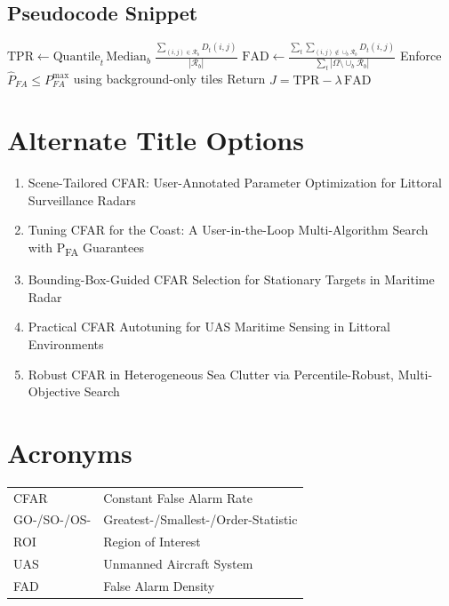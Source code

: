 \documentclass[conf]{new-aiaa}
\begin{document}
\subsection{Pseudocode Snippet}
\begin{algorithm}[h]
\caption{Score and Constraint Evaluation}
\begin{algorithmic}[1]
\STATE $\mathrm{TPR}\leftarrow \mathrm{Quantile}_t\,\mathrm{Median}_b\;\frac{\sum_{(i,j)\in\mathcal{R}_b} D_t(i,j)}{|\mathcal{R}_b|}$
\STATE $\mathrm{FAD}\leftarrow \frac{\sum_{t}\sum_{(i,j)\notin\cup_b \mathcal{R}_b} D_t(i,j)}{\sum_{t}|\Omega\setminus\cup_b \mathcal{R}_b|}$
\STATE Enforce $\widehat{P}_{FA}\le P_{FA}^{\max}$ using background-only tiles
\STATE Return $J=\mathrm{TPR}-\lambda\,\mathrm{FAD}$
\end{algorithmic}
\end{algorithm}

\section{Alternate Title Options}
\begin{enumerate}
  \item Scene-Tailored CFAR: User-Annotated Parameter Optimization for Littoral Surveillance Radars
  \item Tuning CFAR for the Coast: A User-in-the-Loop Multi-Algorithm Search with P\textsubscript{FA} Guarantees
  \item Bounding-Box-Guided CFAR Selection for Stationary Targets in Maritime Radar
  \item Practical CFAR Autotuning for UAS Maritime Sensing in Littoral Environments
  \item Robust CFAR in Heterogeneous Sea Clutter via Percentile-Robust, Multi-Objective Search
\end{enumerate}

\section{Acronyms}
\begin{tabular}{ll}
CFAR & Constant False Alarm Rate \\
GO-/SO-/OS- & Greatest-/Smallest-/Order-Statistic \\
ROI & Region of Interest \\
UAS & Unmanned Aircraft System \\
FAD & False Alarm Density \\
\end{tabular}
\end{document}
